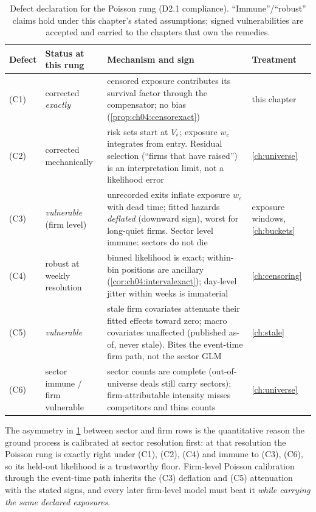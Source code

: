 \begin{table}[htbp]
\centering
\small
\begin{tabular}{p{} p{} p{} p{}}
\toprule
\textbf{Defect} & \textbf{Status at this rung} & \textbf{Mechanism and
sign} & \textbf{Treatment} \\
\midrule
(C1) & corrected \emph{exactly} & censored exposure contributes its
survival factor through the compensator; no bias
(\cref{prop:ch04:censorexact}) & this chapter \\
\addlinespace
(C2) & corrected mechanically & risk sets start at $V_i$; exposure
$w_c$ integrates from entry. Residual selection (``firms that have
raised'') is an interpretation limit, not a likelihood error &
\cref{ch:universe} \\
\addlinespace
(C3) & \emph{vulnerable} (firm level) & unrecorded exits inflate exposure
$w_c$ with dead time; fitted hazards \emph{deflated} (downward sign),
worst for long-quiet firms. Sector level immune: sectors do not die &
exposure windows, \cref{ch:buckets} \\
\addlinespace
(C4) & robust at weekly resolution & binned likelihood is exact; within-bin
positions are ancillary (\cref{cor:ch04:intervalexact}); day-level jitter
within weeks is immaterial & \cref{ch:censoring} \\
\addlinespace
(C5) & \emph{vulnerable} & stale firm covariates attenuate their fitted
effects toward zero; macro covariates unaffected (published as-of, never
stale). Bites the event-time firm path, not the sector GLM &
\cref{ch:stale} \\
\addlinespace
(C6) & sector immune / firm vulnerable & sector counts are complete
(out-of-universe deals still carry sectors); firm-attributable intensity
misses competitors and thins counts & \cref{ch:universe} \\
\bottomrule
\end{tabular}
\caption{Defect declaration for the Poisson rung (D2.1 compliance).
``Immune''/``robust'' claims hold under this chapter's stated
assumptions; signed vulnerabilities are accepted and carried to the
chapters that own the remedies.}
\label{tab:ch04:defects}
\end{table}

The asymmetry in \cref{tab:ch04:defects} between sector and firm rows is
the quantitative reason the ground process is calibrated at sector
resolution first: at that resolution the Poisson rung is exactly right
under (C1), (C2), (C4) and immune to (C3), (C6), so its held-out
likelihood is a trustworthy floor. Firm-level Poisson calibration through
the event-time path inherits the (C3) deflation and (C5) attenuation with
the stated signs, and every later firm-level model must beat it
\emph{while carrying the same declared exposures}.

